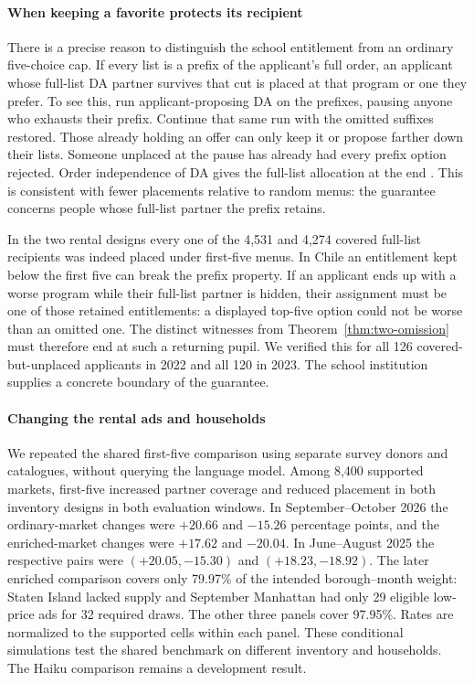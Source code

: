 \paragraph{When keeping a favorite protects its recipient}
There is a precise reason to distinguish the school entitlement from an ordinary five-choice cap. If every list is a prefix of the applicant's full order, an applicant whose full-list DA partner survives that cut is placed at that program or one they prefer. To see this, run applicant-proposing DA on the prefixes, pausing anyone who exhausts their prefix. Continue that same run with the omitted suffixes restored. Those already holding an offer can only keep it or propose farther down their lists. Someone unplaced at the pause has already had every prefix option rejected. Order independence of DA gives the full-list allocation at the end \citep{gale1962,galesoto}. This is consistent with fewer placements relative to random menus: the guarantee concerns people whose full-list partner the prefix retains.

In the two rental designs every one of the 4,531 and 4,274 covered full-list recipients was indeed placed under first-five menus. In Chile an entitlement kept below the first five can break the prefix property. If an applicant ends up with a worse program while their full-list partner is hidden, their assignment must be one of those retained entitlements: a displayed top-five option could not be worse than an omitted one. The distinct witnesses from Theorem~\ref{thm:two-omission} must therefore end at such a returning pupil. We verified this for all 126 covered-but-unplaced applicants in 2022 and all 120 in 2023. The school institution supplies a concrete boundary of the guarantee.

\paragraph{Changing the rental ads and households}
We repeated the shared first-five comparison using separate survey donors and catalogues, without querying the language model. Among 8,400 supported markets, first-five increased partner coverage and reduced placement in both inventory designs in both evaluation windows. In September--October 2026 the ordinary-market changes were $+20.66$ and $-15.26$ percentage points, and the enriched-market changes were $+17.62$ and $-20.04$. In June--August 2025 the respective pairs were $(+20.05,-15.30)$ and $(+18.23,-18.92)$. The later enriched comparison covers only 79.97\% of the intended borough--month weight: Staten Island lacked supply and September Manhattan had only 29 eligible low-price ads for 32 required draws. The other three panels cover 97.95\%. Rates are normalized to the supported cells within each panel. These conditional simulations test the shared benchmark on different inventory and households. The Haiku comparison remains a development result.
